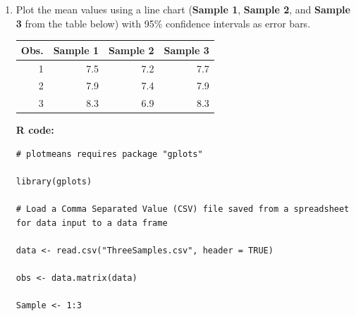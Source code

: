 \begin{enumerate}
\begin{lstlisting}
# create vectors from above variables to load into the function
mu <- c(x1,x2)
s <- c(s1,s2)
n <- nrow(data)

# Calculate the interval
error <- qt(0.975,df=n-1)*s/sqrt(n)
left <- mu-error
right <- mu+error

# Produce the output
cat("Mean, Standard Deviation, and 	Confidence Intervals:","\n \n")

cat("Sample 1:", "Mean: ", x1, "  Std. Dev: ", s1, "\n")
cat("Confidence interval:", left[1], "to", right[1], "\n \n")

cat("Sample 2:", "Mean: ", x2, "  Std. Dev: ", s2, "\n")
cat("Confidence interval:", left[2], "to", right[2])
\end{lstlisting} 

\textbf{Output:}

{\small \texttt{Mean, Standard Deviation, and Confidence Intervals:} 

\texttt{Sample 1: Mean:  15.136   Std. Dev:  0.3913822} 
\texttt{Confidence interval: 14.65003 to 15.62197}

\texttt{Sample 2: Mean:  14.778   Std. Dev:  0.1333042 }
\texttt{Confidence interval: 14.61248 to 14.94352}}



	\item Plot the mean values using a line chart (\textbf{Sample 1}, \textbf{Sample 2}, and \textbf{Sample 3} from the table below) with 95\% confidence intervals as error bars.
	
	\begin{tabular}{|r|r|r|r|}
		\hline Obs. & \textbf{Sample 1} & \textbf{Sample 2} & \textbf{Sample 3} \\ 
		\hline 1 & 7.5 & 7.2 & 7.7 \\ 
		\hline 2 & 7.9 & 7.4 & 7.9 \\ 
		\hline 3 & 8.3 & 6.9 & 8.3 \\ 
		\hline 
	\end{tabular} 

\bigskip
\textbf{R code:}
\begin{lstlisting}
# plotmeans requires package "gplots"

library(gplots)

# Load a Comma Separated Value (CSV) file saved from a spreadsheet for data input to a data frame

data <- read.csv("ThreeSamples.csv", header = TRUE)

obs <- data.matrix(data)

Sample <- 1:3


\end{lstlisting}
\end{enumerate}
